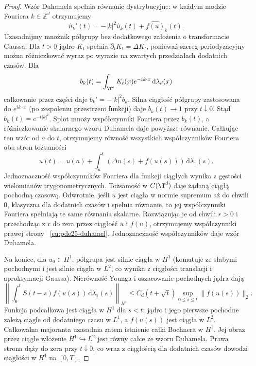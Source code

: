 \begin{proof}
Wzór Duhamela spełnia równanie dystrybucyjne:
w każdym modzie Fouriera $k\in\mathbb Z^d$ otrzymujemy
\[
 \widehat u_k'(t)=-|k|^2\widehat u_k(t)
                  +\widehat{f(u)}_k(t).
\]
Uzasadnijmy mnożnik półgrupy bez dodatkowego
założenia o transformacie Gaussa. Dla $t>0$
jądro $K_t$ spełnia $\partial_tK_t=\Delta K_t$,
ponieważ szereg periodyzacyjny można różniczkować
wyraz po wyrazie na zwartych przedziałach dodatnich
czasów. Dla
\[
 b_k(t)=\int_{\T^d}K_t(x)e^{-ik\cdot x}\,
                       \mathrm d\lambda_d(x)
\]
całkowanie przez części daje $b_k'=-|k|^2 b_k$.
Silna ciągłość półgrupy zastosowana do
$e^{ik\cdot x}$ (po zespoleniu przestrzeni funkcji)
daje $b_k(t)\to1$ przy $t\downarrow0$.
Stąd $b_k(t)=e^{-t|k|^2}$. Splot mnoży
współczynniki Fouriera przez $b_k(t)$, a
różniczkowanie skalarnego wzoru Duhamela
daje powyższe równanie. Całkując ten wzór
od $a$ do $t$, otrzymujemy równość wszystkich
współczynników Fouriera obu stron tożsamości
\[
 u(t)=u(a)+\int_a^t(\Delta u(s)+f(u(s)))\,
                      \mathrm d\lambda_1(s).
\]
Jednoznaczność współczynników Fouriera dla funkcji
ciągłych wynika z gęstości wielomianów trygonometrycznych.
Tożsamość w $C(\T^d)$ daje żądaną ciągłą pochodną
czasową. Odwrotnie, jeśli $u$ jest ciągła w normie
supremum aż do chwili $0$, klasyczna dla dodatnich
czasów i spełnia równanie, to jej współczynniki
Fouriera spełniają te same równania skalarne.
Rozwiązując je od chwili $r>0$ i przechodząc
z $r$ do zera przez ciągłość $u$ i $f(u)$,
otrzymujemy współczynniki prawej strony
~\eqref{eq:pde25-duhamel}. Jednoznaczność
współczynników daje wzór Duhamela.

Na koniec, dla $u_0\in H^1$, półgrupa jest silnie
ciągła w $H^1$ (komutuje ze słabymi pochodnymi
i jest silnie ciągła w $L^2$, co wynika z ciągłości
translacji i aproksymacji Gaussa).
Nierówność Younga i oszacowanie pochodnych jądra
dają
\[
 \left\|\int_0^t S(t-s)f(u(s))\,
              \mathrm d\lambda_1(s)\right\|_{H^1}
 \le C_d(t+\sqrt t)\sup_{0\le s\le t}\|f(u(s))\|_2.
\]
Funkcja podcałkowa jest ciągła w $H^1$ dla $s<t$:
jądro i jego pierwsze pochodne zależą ciągle
od dodatniego czasu w $L^1$, a $f(u(s))$ jest
ciągła w $L^2$. Całkowalna majoranta uzasadnia
zatem istnienie całki Bochnera w $H^1$. Jej obraz
przez ciągłe włożenie $H^1\hookrightarrow L^2$
jest równy całce ze wzoru Duhamela. Prawa strona dąży do zera przy $t\downarrow0$,
co wraz z ciągłością dla dodatnich czasów dowodzi
ciągłości w $H^1$ na $[0,T]$.
\end{proof}

